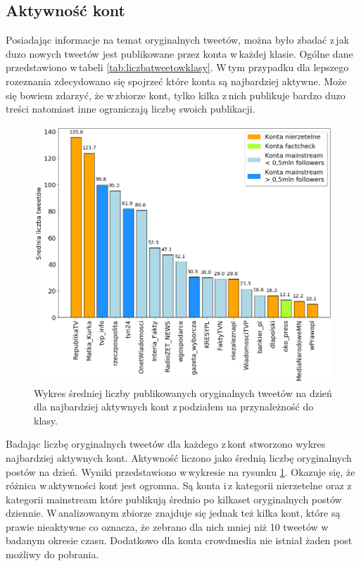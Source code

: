 \subsection{Aktywność kont}
Posiadając informacje na temat oryginalnych tweetów, można było zbadać z\,jak duzo nowych tweetów jest publikowane przez konta w\,każdej klasie. Ogólne dane przedstawiono w\,tabeli \ref{tab:liczbatweetowklasy}. W\,tym przypadku dla lepszego rozeznania zdecydowano się spojrzeć które konta są najbardziej aktywne. Może się bowiem zdarzyć, że w\,zbiorze kont, tylko kilka z\,nich publikuje bardzo duzo treści natomiast inne ograniczają liczbę swoich publikacji. 
\par
\begin{figure}[!h]
	\centering \includegraphics[width=0.9\linewidth]{img/results/tweetsperday.png}
	\caption{Wykres średniej liczby publikowanych oryginalnych tweetów na dzień dla najbardziej aktywnych kont z\,podziałem na przynależność do klasy.} \label{fig:tweetsperday}
\end{figure}
\par
Badając liczbę oryginalnych tweetów dla każdego z\,kont stworzono wykres najbardziej aktywnych kont. Aktywność liczono jako średnią liczbę oryginalnych postów na dzień. Wyniki przedstawiono w\,wykresie na rysunku \ref{fig:tweetsperday}. Okazuje się, że różnica w\,aktywności kont jest ogromna. Są konta i\,z kategorii nierzetelne oraz z\,kategorii mainstream które publikują średnio po kilkaset oryginalnych postów dziennie. W\,analizowanym zbiorze znajduje się jednak też kilka kont, które są prawie nieaktywne co oznacza, że zebrano dla nich mniej niż 10 tweetów w\,badanym okresie czasu. Dodatkowo dla konta crowdmedia nie istniał żaden post możliwy do pobrania.